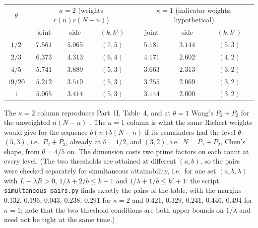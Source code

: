 \documentclass[11pt]{amsart}
\theoremstyle{remark}
\begin{document}
\begin{center}\small
\begin{tabular}{c|ccc|ccc}
\toprule
$\theta$ & \multicolumn{3}{c|}{$\kappa=2$ (weights $r(n)r(N-n)$)} & \multicolumn{3}{c}{$\kappa=1$ (indicator weights, hypothetical)}\\
 & joint & side & $(k,k')$ & joint & side & $(k,k')$\\
\midrule
$1/2$ & $7.561$ & $5.065$ & $(7,5)$ & $5.181$ & $3.144$ & $(5,3)$\\
$2/3$ & $6.373$ & $4.313$ & $(6,4)$ & $4.171$ & $2.602$ & $(4,2)$\\
$4/5$ & $5.741$ & $3.889$ & $(5,3)$ & $3.663$ & $2.313$ & $(3,2)$\\
$19/20$ & $5.212$ & $3.519$ & $(5,3)$ & $3.255$ & $2.069$ & $(3,2)$\\
$1$ & $5.065$ & $3.414$ & $(5,3)$ & $3.144$ & $2.000$ & $(3,2)$\\
\bottomrule
\end{tabular}
\end{center}

The $\kappa=2$ column reproduces Part~II, Table~4, and at $\theta=1$ Wang's $P_2+P_3$ for the unweighted $n(N-n)$ \cite{Wang}. The $\kappa=1$ column is what the same Richert weights would give for the sequence $b(n)b(N-n)$ if its remainders had the level $\theta$: $(5,3)$, i.e.\ $P_2+P_3$, already at $\theta=1/2$, and $(3,2)$, i.e.\ $N=P_1+P_2$, Chen's shape, from $\theta=4/5$ on. The dimension costs two prime factors on each count at every level. (The two thresholds are attained at different $(a,b)$, so the pairs were checked separately for simultaneous attainability, i.e.\ for one set $(a,b,\lambda)$ with $L-\lambda R>0$, $1/\lambda+2/b\le k+1$ and $1/\lambda+1/b\le k'+1$: the script \texttt{simultaneous\_pairs.py} finds exactly the pairs of the table, with the margins $0.132$, $0.196$, $0.043$, $0.238$, $0.291$ for $\kappa=2$ and $0.421$, $0.329$, $0.241$, $0.446$, $0.494$ for $\kappa=1$; note that the two threshold conditions are both upper bounds on $1/\lambda$ and need not be tight at the same time.)
\end{document}
